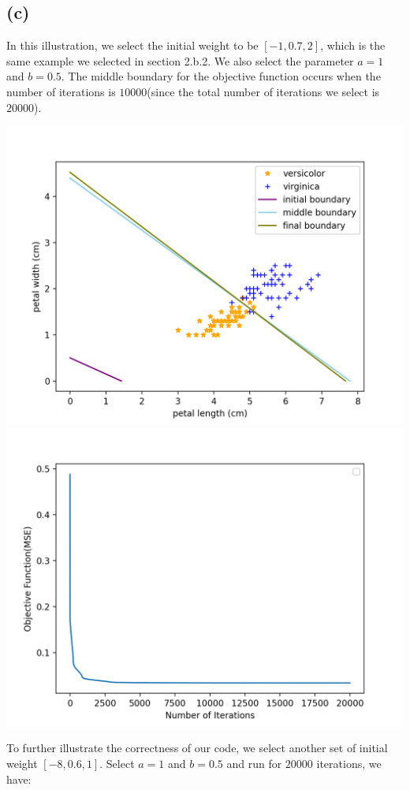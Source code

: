 \documentclass[12pt]{article}
\begin{document}
\subsection*{(c)}
In this illustration, we select the initial weight to be $[-1, 0.7, 2]$, which is the same example we selected in section 2.b.2. We also select the parameter $a = 1$ and 
$b = 0.5$. The middle boundary for the objective function occurs when the number of iterations is $10000$(since the total number of iterations we select is $20000$).
\begin{center}
    \includegraphics[scale=0.35]{fig/p3b1.png}
    \includegraphics[scale=0.35]{fig/p3b2.png}
\end{center}
To further illustrate the correctness of our code, we select another set of initial weight $[-8, 0.6, 1]$. Select $a = 1$ and $b = 0.5$ and run for $20000$ iterations, we have: 
\end{document}
